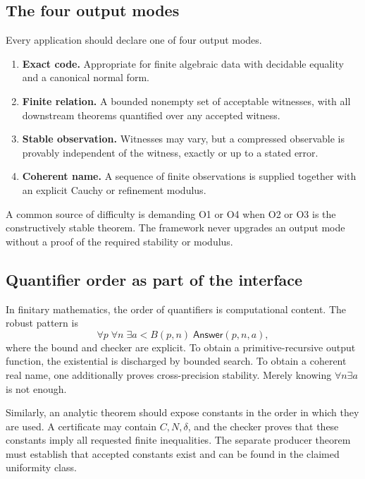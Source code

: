 \subsection{The four output modes}

Every application should declare one of four output modes.

\begin{enumerate}[label=\textbf{O\arabic*.}]
\item \textbf{Exact code.}  Appropriate for finite algebraic data with decidable
      equality and a canonical normal form.
\item \textbf{Finite relation.}  A bounded nonempty set of acceptable witnesses,
      with all downstream theorems quantified over any accepted witness.
\item \textbf{Stable observation.}  Witnesses may vary, but a compressed
      observable is provably independent of the witness, exactly or up to a
      stated error.
\item \textbf{Coherent name.}  A sequence of finite observations is supplied
      together with an explicit Cauchy or refinement modulus.
\end{enumerate}

A common source of difficulty is demanding O1 or O4 when O2 or O3 is the
constructively stable theorem.  The framework never upgrades an output mode
without a proof of the required stability or modulus.

\subsection{Quantifier order as part of the interface}

In finitary mathematics, the order of quantifiers is computational content.
The robust pattern is
\[
  \forall p\;\forall n\;\exists a<B(p,n)\;
  \mathsf{Answer}(p,n,a),
\]
where the bound and checker are explicit.  To obtain a primitive-recursive
output function, the existential is discharged by bounded search.  To obtain a
coherent real name, one additionally proves cross-precision stability.  Merely
knowing \(\forall n\exists a\) is not enough.

Similarly, an analytic theorem should expose constants in the order in which
they are used.  A certificate may contain \(C,N,\delta\), and the checker proves
that these constants imply all requested finite inequalities.  The separate
producer theorem must establish that accepted constants exist and can be found
in the claimed uniformity class.
